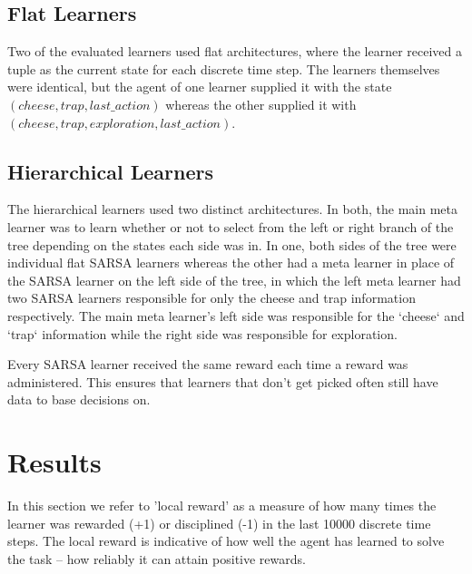 \documentclass{article}
\begin{document}
	\subsection{Flat Learners}
	Two of the evaluated learners used flat architectures, where the learner received a tuple as the current state for each discrete time step. The learners themselves were identical, but the agent of one learner supplied it with the state $(cheese, trap, last\_action)$ whereas the other supplied it with $(cheese, trap, exploration, last\_action)$. 

	\subsection{Hierarchical Learners}
	The hierarchical learners used two distinct architectures. In both, the main meta learner was to learn whether or not to select from the left or right branch of the tree depending on the states each side was in. In one, both sides of the tree were individual flat SARSA learners whereas the other had a meta learner in place of the SARSA learner on the left side of the tree, in which the left meta learner had two SARSA learners responsible for only the cheese and trap information respectively.
	The main meta learner's left side was responsible for the `cheese` and `trap` information while the right side was responsible for exploration. 

	Every SARSA learner received the same reward each time a reward was administered. This ensures that learners that don't get picked often still have data to base decisions on.

	\section{Results}
	\label{sec:results}
	In this section we refer to 'local reward' as a measure of how many times the learner was rewarded (+1) or disciplined (-1) in the last 10000 discrete time steps. The local reward is indicative of how well the agent has learned to solve the task -- how reliably it can attain positive rewards.
\end{document}
